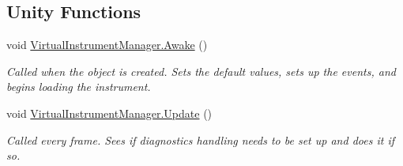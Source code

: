 \subsection*{Unity Functions}
\begin{DoxyCompactItemize}
\item 
\mbox{\label{group___virtual_instrument_manager_event_types_gab92bac4e22476ffe39fc40f49fbd6ae5}} 
void \hyperlink{group___virtual_instrument_manager_event_types_gab92bac4e22476ffe39fc40f49fbd6ae5}{Virtual\+Instrument\+Manager.\+Awake} ()
\begin{DoxyCompactList}\small\item\em Called when the object is created. Sets the default values, sets up the events, and begins loading the instrument. \end{DoxyCompactList}\item 
\mbox{\label{group___virtual_instrument_manager_event_types_gac10dc6a13185a6ab7c658a6f96b02998}} 
void \hyperlink{group___virtual_instrument_manager_event_types_gac10dc6a13185a6ab7c658a6f96b02998}{Virtual\+Instrument\+Manager.\+Update} ()
\begin{DoxyCompactList}\small\item\em Called every frame. Sees if diagnostics handling needs to be set up and does it if so. \end{DoxyCompactList}\end{DoxyCompactItemize}

